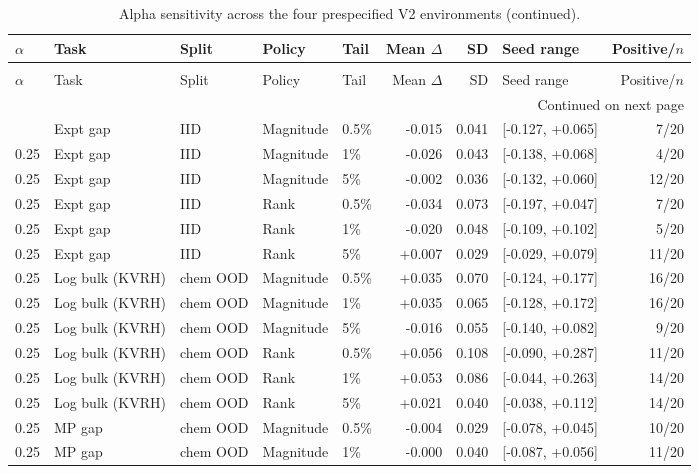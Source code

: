 \setlength{\tabcolsep}{3pt}
\scriptsize
\begin{longtable}{@{}lllllrrlr@{}}
\caption{Alpha sensitivity across the four prespecified V2 environments.}\label{tab:alpha_sensitivity}\\
\toprule
$\alpha$ & Task & Split & Policy & Tail & Mean $\Delta$ & SD & Seed range & Positive/$n$ \\
\midrule
\endfirsthead
\caption[]{Alpha sensitivity across the four prespecified V2 environments (continued).}\\
\toprule
$\alpha$ & Task & Split & Policy & Tail & Mean $\Delta$ & SD & Seed range & Positive/$n$ \\
\midrule
\endhead
\midrule\multicolumn{9}{r}{Continued on next page}\\
\endfoot
\bottomrule\endlastfoot
0.25 & Expt gap & IID & Magnitude & 0.5\% & -0.015 & 0.041 & [-0.127, +0.065] & 7/20 \\
0.25 & Expt gap & IID & Magnitude & 1\% & -0.026 & 0.043 & [-0.138, +0.068] & 4/20 \\
0.25 & Expt gap & IID & Magnitude & 5\% & -0.002 & 0.036 & [-0.132, +0.060] & 12/20 \\
0.25 & Expt gap & IID & Rank & 0.5\% & -0.034 & 0.073 & [-0.197, +0.047] & 7/20 \\
0.25 & Expt gap & IID & Rank & 1\% & -0.020 & 0.048 & [-0.109, +0.102] & 5/20 \\
0.25 & Expt gap & IID & Rank & 5\% & +0.007 & 0.029 & [-0.029, +0.079] & 11/20 \\
0.25 & Log bulk (KVRH) & chem OOD & Magnitude & 0.5\% & +0.035 & 0.070 & [-0.124, +0.177] & 16/20 \\
0.25 & Log bulk (KVRH) & chem OOD & Magnitude & 1\% & +0.035 & 0.065 & [-0.128, +0.172] & 16/20 \\
0.25 & Log bulk (KVRH) & chem OOD & Magnitude & 5\% & -0.016 & 0.055 & [-0.140, +0.082] & 9/20 \\
0.25 & Log bulk (KVRH) & chem OOD & Rank & 0.5\% & +0.056 & 0.108 & [-0.090, +0.287] & 11/20 \\
0.25 & Log bulk (KVRH) & chem OOD & Rank & 1\% & +0.053 & 0.086 & [-0.044, +0.263] & 14/20 \\
0.25 & Log bulk (KVRH) & chem OOD & Rank & 5\% & +0.021 & 0.040 & [-0.038, +0.112] & 14/20 \\
0.25 & MP gap & chem OOD & Magnitude & 0.5\% & -0.004 & 0.029 & [-0.078, +0.045] & 10/20 \\
0.25 & MP gap & chem OOD & Magnitude & 1\% & -0.000 & 0.040 & [-0.087, +0.056] & 11/20 \\

\end{longtable}
